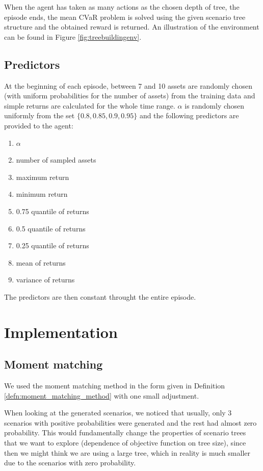 When the agent has taken as many actions as the chosen depth of tree, the episode ends, the mean CVaR problem is solved using the given scenario tree structure and the obtained reward is returned. An illustration of the environment can be found in Figure \ref{fig:treebuildingenv}.

\subsection{Predictors}
\label{subsection:predictors}
At the beginning of each episode, between 7 and 10 assets are randomly chosen (with uniform probabilities for the number of assets) from the training data and simple returns are calculated for the whole time range. $\alpha$ is randomly chosen uniformly from the set $\{0.8, 0.85, 0.9, 0.95\}$ and the following predictors are provided to the agent:
\begin{enumerate}
\item $\alpha$
\item number of sampled assets
\item maximum return
\item minimum return
\item 0.75 quantile of returns
\item 0.5 quantile of returns
\item 0.25 quantile of returns
\item mean of returns
\item variance of returns
\end{enumerate}
The predictors are then constant throught the entire episode.

\section{Implementation}
\subsection{Moment matching}
We used the moment matching method in the form given in Definition \ref{defn:moment_matching_method} with one small adjustment. 

When looking at the generated scenarios, we noticed that usually, only 3 scenarios with positive probabilities were generated and the rest had almost zero probability. This would fundamentally change the properties of scenario trees that we want to explore (dependence of objective function on tree size), since then we might think we are using a large tree, which in reality is much smaller due to the scenarios with zero probability. 

